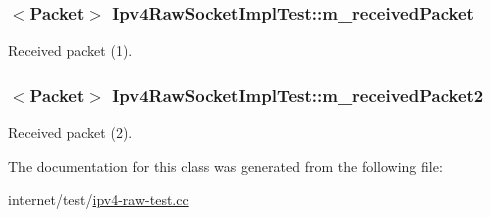 \subsubsection[{\texorpdfstring{m\+\_\+received\+Packet}{m_receivedPacket}}]{$<${\bf Packet}$>$ Ipv4\+Raw\+Socket\+Impl\+Test\+::m\+\_\+received\+Packet\hspace{0.3cm}{\ttfamily [private]}}\hypertarget{classIpv4RawSocketImplTest_a38dee32030c77d03c740508d0a68bd22}{}\label{classIpv4RawSocketImplTest_a38dee32030c77d03c740508d0a68bd22}


Received packet (1). 

\subsubsection[{\texorpdfstring{m\+\_\+received\+Packet2}{m_receivedPacket2}}]{$<${\bf Packet}$>$ Ipv4\+Raw\+Socket\+Impl\+Test\+::m\+\_\+received\+Packet2\hspace{0.3cm}{\ttfamily [private]}}\hypertarget{classIpv4RawSocketImplTest_a52607bc760ccb25a084978830b95d162}{}\label{classIpv4RawSocketImplTest_a52607bc760ccb25a084978830b95d162}


Received packet (2). 



The documentation for this class was generated from the following file\+:\begin{DoxyCompactItemize}
\item 
internet/test/\hyperlink{ipv4-raw-test_8cc}{ipv4-\/raw-\/test.\+cc}\end{DoxyCompactItemize}
